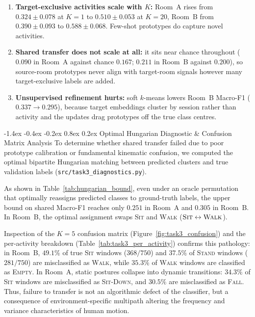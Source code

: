 \documentclass[10pt,a4paper]{article}
\makeatletter
\renewcommand{\subsection}{\@startsection{subsection}{2}{\z@}%
  {-1.4ex \@plus -0.4ex \@minus -0.2ex}%
  {0.8ex \@plus 0.2ex}%
  {\normalfont\normalsize\bfseries\color{secondary}}}
\makeatother
\begin{document}
\begin{enumerate}
    \item \textbf{Target-exclusive activities scale with $K$:} Room~A rises from $0.324 \pm 0.078$ at $K=1$ to $\mathbf{0.510 \pm 0.053}$ at $K=20$, Room~B from $0.390 \pm 0.093$ to $\mathbf{0.588 \pm 0.068}$. Few-shot prototypes do capture novel activities.
    \item \textbf{Shared transfer does not scale at all:} it sits near chance throughout ($0.090$ in Room~A against chance $0.167$; $0.211$ in Room~B against $0.200$), so source-room prototypes never align with target-room signals however many target-exclusive labels are added.
    \item \textbf{Unsupervised refinement hurts:} soft $k$-means lowers Room~B Macro-F1 ($0.337 \to 0.295$), because target embeddings cluster by session rather than activity and the updates drag prototypes off the true class centres.
\end{enumerate}

\subsection{Optimal Hungarian Diagnostic \& Confusion Matrix Analysis}
To determine whether shared transfer failed due to poor prototype calibration or fundamental kinematic confusion, we computed the optimal bipartite Hungarian matching between predicted clusters and true validation labels (\texttt{src/task3\_diagnostics.py}).

As shown in Table~\ref{tab:hungarian_bound}, even under an oracle permutation that optimally reassigns predicted classes to ground-truth labels, the upper bound on shared Macro-F1 reaches only $\mathbf{0.251}$ in Room~A and $\mathbf{0.305}$ in Room~B. In Room~B, the optimal assignment swaps \textsc{Sit} and \textsc{Walk} ($\textsc{Sit} \leftrightarrow \textsc{Walk}$). 

Inspection of the $K=5$ confusion matrix (Figure~\ref{fig:task3_confusion}) and the per-activity breakdown (Table~\ref{tab:task3_per_activity}) confirms this pathology: in Room~B, $\mathbf{49.1\%}$ of true \textsc{Sit} windows ($368/750$) and $\mathbf{37.5\%}$ of \textsc{Stand} windows ($281/750$) are misclassified as \textsc{Walk}, while $\mathbf{35.3\%}$ of \textsc{Walk} windows are classified as \textsc{Empty}. In Room~A, static postures collapse into dynamic transitions: $34.3\%$ of \textsc{Sit} windows are misclassified as \textsc{Sit-Down}, and $30.5\%$ are misclassified as \textsc{Fall}. Thus, failure to transfer is not an algorithmic defect of the classifier, but a consequence of environment-specific multipath altering the frequency and variance characteristics of human motion.
\end{document}
